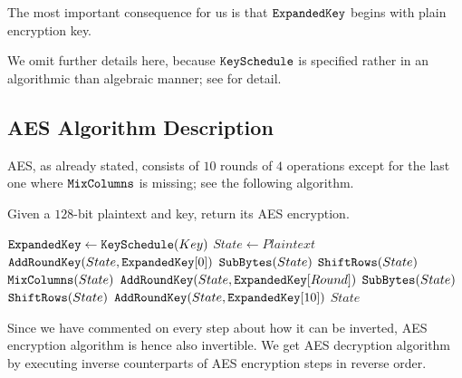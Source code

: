 	\begin{note}
	\label{note:expkey}
		The most important consequence for us is that $\texttt{ExpandedKey}$ begins with plain encryption key.
	\end{note}
	
	We omit further details here, because $\texttt{KeySchedule}$ is specified rather in an algorithmic than algebraic manner; see \cite[pp.43-45]{daemen2013rijndael} for detail.



\subsection{AES Algorithm Description}

AES, as already stated, consists of $10$ rounds of $4$ operations except for the last one where $\texttt{MixColumns}$ is missing; see the following algorithm.

\begin{alg}
\label{alg:aes}
	Given a $128$-bit plaintext and key, return its AES encryption.
	\begin{algorithmic}[1]
			\State $\texttt{ExpandedKey} \gets \texttt{KeySchedule}(Key)$
			\State $State \gets Plaintext$ \label{line:stateplain}
			\State $\texttt{AddRoundKey}(State, \texttt{ExpandedKey}[0])$ \label{line:addrk}
			 \label{line:aesfor}
				\State $\texttt{SubBytes}(State)$
				\State $\texttt{ShiftRows}(State)$
				\State $\texttt{MixColumns}(State)$
				\State $\texttt{AddRoundKey}(State, \texttt{ExpandedKey}[Round])$
			\EndFor
			\State $\texttt{SubBytes}(State)$
			\State $\texttt{ShiftRows}(State)$
			\State $\texttt{AddRoundKey}(State, \texttt{ExpandedKey}[10])$
			\State\Return $State$
		\EndFunction
	\end{algorithmic}
\end{alg}

\begin{note}
	Since we have commented on every step about how it can be inverted, AES encryption algorithm is hence also invertible. We get AES decryption algorithm by executing inverse counterparts of AES encryption steps in reverse order.
\end{note}



